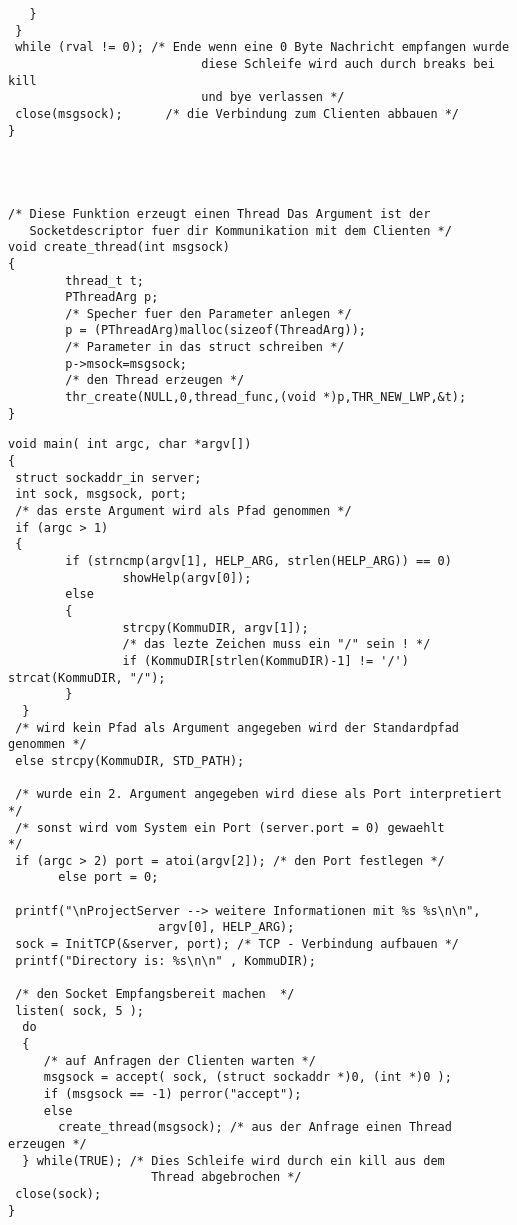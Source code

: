 \begin{verbatim}
   } 
 }
 while (rval != 0); /* Ende wenn eine 0 Byte Nachricht empfangen wurde
                           diese Schleife wird auch durch breaks bei kill
                           und bye verlassen */
 close(msgsock);      /* die Verbindung zum Clienten abbauen */
} 




/* Diese Funktion erzeugt einen Thread Das Argument ist der
   Socketdescriptor fuer dir Kommunikation mit dem Clienten */
void create_thread(int msgsock)
{
        thread_t t;
        PThreadArg p;
        /* Specher fuer den Parameter anlegen */
        p = (PThreadArg)malloc(sizeof(ThreadArg));
        /* Parameter in das struct schreiben */
        p->msock=msgsock;
        /* den Thread erzeugen */
        thr_create(NULL,0,thread_func,(void *)p,THR_NEW_LWP,&t);
}
\end{verbatim} 
         
\pagebreak

\begin{verbatim}
void main( int argc, char *argv[])
{
 struct sockaddr_in server;
 int sock, msgsock, port;
 /* das erste Argument wird als Pfad genommen */
 if (argc > 1)
 {
        if (strncmp(argv[1], HELP_ARG, strlen(HELP_ARG)) == 0)
                showHelp(argv[0]);
        else
        {
                strcpy(KommuDIR, argv[1]); 
                /* das lezte Zeichen muss ein "/" sein ! */
                if (KommuDIR[strlen(KommuDIR)-1] != '/') strcat(KommuDIR, "/");
        }
  }
 /* wird kein Pfad als Argument angegeben wird der Standardpfad genommen */
 else strcpy(KommuDIR, STD_PATH);
 
 /* wurde ein 2. Argument angegeben wird diese als Port interpretiert */
 /* sonst wird vom System ein Port (server.port = 0) gewaehlt         */
 if (argc > 2) port = atoi(argv[2]); /* den Port festlegen */
       else port = 0;
 
 printf("\nProjectServer --> weitere Informationen mit %s %s\n\n", 
                     argv[0], HELP_ARG);
 sock = InitTCP(&server, port); /* TCP - Verbindung aufbauen */
 printf("Directory is: %s\n\n" , KommuDIR);
 
 /* den Socket Empfangsbereit machen  */
 listen( sock, 5 );
  do
  {
     /* auf Anfragen der Clienten warten */
     msgsock = accept( sock, (struct sockaddr *)0, (int *)0 );
     if (msgsock == -1) perror("accept");
     else
       create_thread(msgsock); /* aus der Anfrage einen Thread erzeugen */
  } while(TRUE); /* Dies Schleife wird durch ein kill aus dem
                    Thread abgebrochen */
 close(sock);
}
\end{verbatim} 
         

